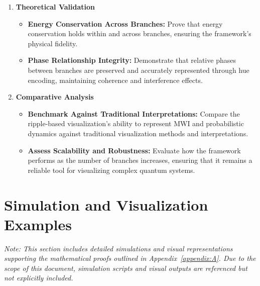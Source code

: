 \documentclass[12pt]{article}
\begin{document}
\begin{enumerate}
    \item \textbf{Theoretical Validation}
    \begin{itemize}
        \item \textbf{Energy Conservation Across Branches:} Prove that energy conservation holds within and across branches, ensuring the framework’s physical fidelity.
        
        \item \textbf{Phase Relationship Integrity:} Demonstrate that relative phases between branches are preserved and accurately represented through hue encoding, maintaining coherence and interference effects.
    \end{itemize}
    
    \item \textbf{Comparative Analysis}
    \begin{itemize}
        \item \textbf{Benchmark Against Traditional Interpretations:} Compare the ripple-based visualization’s ability to represent MWI and probabilistic dynamics against traditional visualization methods and interpretations.
        
        \item \textbf{Assess Scalability and Robustness:} Evaluate how the framework performs as the number of branches increases, ensuring that it remains a reliable tool for visualizing complex quantum systems.
    \end{itemize}
\end{enumerate}

















\section{Simulation and Visualization Examples}
\label{appendix:B}

\textit{Note: This section includes detailed simulations and visual representations supporting the mathematical proofs outlined in Appendix~\ref{appendix:A}. Due to the scope of this document, simulation scripts and visual outputs are referenced but not explicitly included.}
\end{document}
